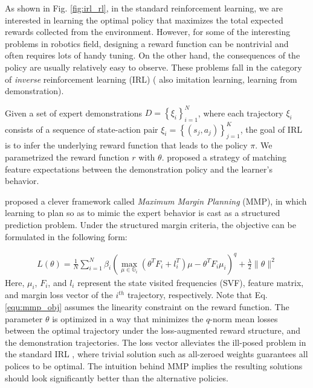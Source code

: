 \documentclass[../thesis.tex]{subfiles}
\begin{document}
As shown in Fig. \ref{fig:irl_rl}, in the standard reinforcement learning, we are interested in learning the optimal policy that maximizes the total expected rewards collected from the environment. 
However, for some of the interesting problems in robotics field, designing a reward function can be nontrivial and often requires lots of handy tuning. 
On the other hand, the consequences of the policy are usually relatively easy to observe. 
These problems fall in the category of \textit{inverse} reinforcement learning (IRL) \cite{ng2000algorithms} ( also imitation learning, learning from demonstration).



Given a set of expert demonstrations $D=\left\{ \xi_i \right\}_{i=1}^{N}$, where each trajectory $\xi_i$ consists of a sequence of state-action pair $\xi_i = \left\{ (s_j, a_j) \right\}_{j=1}^{K}$, the goal of IRL is to infer the underlying reward function that leads to the policy $\pi$. 
We parametrized the reward function $r$ with $\theta$. \citet{abbeel2004apprenticeship} proposed a strategy of matching feature expectations between the demonstration policy and the learner's behavior. 

\citet{ratliff2006maximum} proposed a clever framework called \textit{Maximum Margin Planning} (MMP), in which learning to plan so as to mimic the expert behavior is cast as a structured prediction problem. Under the structured margin criteria, the objective can be formulated in the following form:

\begin{align}
L(\theta) = \frac{1}{N} \sum^{N}_{i=1} \beta_i ( \max_{\mu \in \mathbb{G}_i}(\theta^T F_i + l_i^T)\mu - \theta^TF_i\mu_i )^q +  \frac{\lambda}{2} \| \theta \|^2 \label{equ:mmp_obj}
\end{align}
Here, $\mu_i$, $F_i$, and $l_i$ represent the state visited frequencies (SVF), feature matrix, and margin loss vector of the $i^{th}$ trajectory, respectively. 
Note that Eq. \ref{equ:mmp_obj} assumes the linearity constraint on the reward function. 
The parameter $\theta$ is optimized in a way that minimizes the $q$-norm mean losses between the optimal trajectory under the loss-augmented reward structure, and the demonstration trajectories. 
The loss vector alleviates the ill-posed problem in the standard IRL \cite{abbeel2004apprenticeship}, where trivial solution such as all-zeroed weights guarantees all polices to be optimal.
The intuition behind MMP implies the resulting solutions should look significantly better than the alternative policies.
\end{document}
